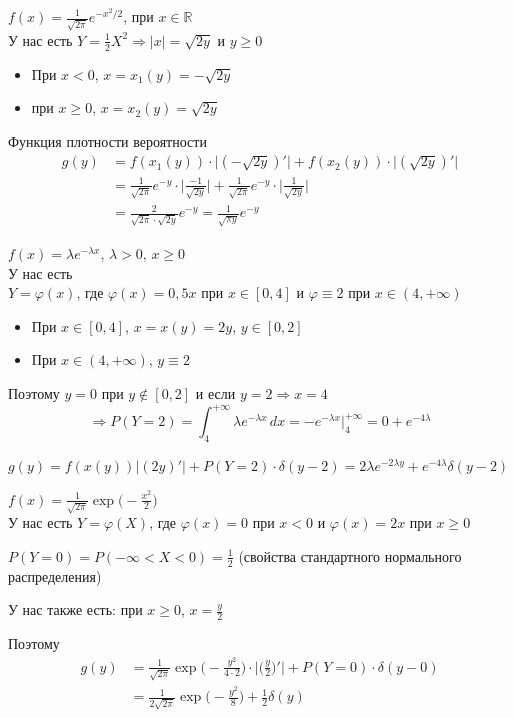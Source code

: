 \begin{exercise}[10]
	$f(x)=\frac{1}{\sqrt{2\pi}} e^{-x^2/2}$, при $x \in \mathbb{R}$ \\ У нас есть $Y=\frac{1}{2} X^2 \Rightarrow |x|=\sqrt{2y}$ и $y \geq 0$
	\begin{itemize}
		\item При $x<0$, $x = x_1(y) = -\sqrt{2y}$
		\item при $x\geq 0$, $x = x_2(y) = \sqrt{2y}$
	\end{itemize}
	Функция плотности вероятности
	\begin{align*}
		g(y) & = f(x_1(y))\cdot \Big|(-\sqrt{2y})'\Big| + f(x_2(y)) \cdot \Big|(\sqrt{2y})'\Big| \\ & = \frac{1}{\sqrt{2\pi}}e^{-y} \cdot \Big|\frac{-1}{\sqrt{2y}}\Big| + \frac{1}{\sqrt{2\pi}}e^{-y} \cdot \Big|\frac{1}{\sqrt{2y}}\Big| \\ & = \frac{2}{\sqrt{2\pi} \cdot \sqrt{2y}} e^{-y} = \frac{1}{\sqrt{\pi y}} e^{-y}
	\end{align*}
\end{exercise}

\begin{exercise}[11]
	$f(x) = \lambda e^{-\lambda x}$, $\lambda > 0$, $x \geq 0$ \\ У нас есть \\ $Y=\varphi(x)$, где $\varphi (x)=0,5x$ при $x \in [0,4]$ и $\varphi \equiv 2$ при $x \in (4, +\infty)$
	
	\begin{itemize}
		\item При $x \in [0, 4]$, $x=x(y)=2y$, $y \in [0,2]$
		\item При $x \in (4, +\infty)$, $y \equiv 2$
	\end{itemize}
	Поэтому $y=0$ при $y \not\in [0, 2]$ и если $y=2 \Rightarrow x=4$ 
	$$\Rightarrow P(Y=2) = \int_{4}^{+\infty} \lambda e^{-\lambda x}\,dx = -e^{-\lambda x}\Big|^{+\infty}_4 = 0 + e^{-4\lambda}$$
	
	$g(y) = f(x(y)) \Big|(2y)'\Big| + P(Y=2) \cdot \delta(y-2) = 2 \lambda e^{-2\lambda y} + e^{-4\lambda}\delta(y-2)$
\end{exercise}

\begin{exercise}[12]
	$f(x)=\frac{1}{\sqrt{2\pi}}\exp\Big(-\frac{x^2}{2}\Big)$ \\ У нас есть $Y=\varphi(X)$, где $\varphi(x)=0$ при $x<0$ и $\varphi(x) = 2x$ при $x \geq 0$
	
	$P(Y=0) = P(-\infty < X < 0) = \frac{1}{2}$ (свойства стандартного нормального распределения)
	
	У нас также есть: при $x \geq 0$, $x = \frac{y}{2}$
	
	Поэтому
	\begin{align*}
		g(y) & = \frac{1}{\sqrt{2\pi}}\exp\Big(-\frac{y^2}{4 \cdot 2}\Big) \cdot \Big|\Big(\frac{y}{2}\Big)'\Big| + P(Y=0) \cdot \delta(y-0) \\ & = \frac{1}{2\sqrt{2\pi}} \exp\Big(-\frac{y^2}{8}\Big) + \frac{1}{2} \delta(y)
	\end{align*}
\end{exercise}